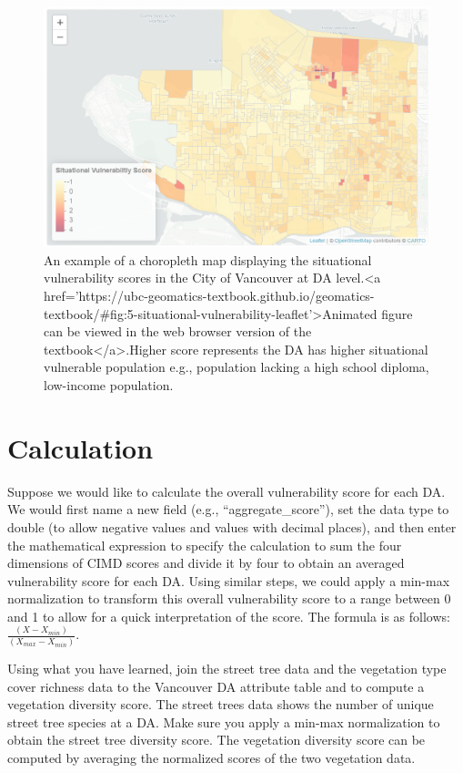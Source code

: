\documentclass[
]{book}
\begin{document}
\begin{figure}
\includegraphics[width=1\linewidth]{images/05-situational-vulnerability-leaflet} \caption{An example of a choropleth map displaying the situational vulnerability scores in the City of Vancouver at DA level.<a href='https://ubc-geomatics-textbook.github.io/geomatics-textbook/#fig:5-situational-vulnerability-leaflet'>Animated figure can be viewed in the web browser version of the textbook</a>.Higher score represents the DA has higher situational vulnerable population e.g., population lacking a high school diploma, low-income population.}\label{fig:5-situational-vulnerability-leaflet}
\end{figure}

\section{Calculation}\label{calculation}

Suppose we would like to calculate the overall vulnerability score for each DA. We would first name a new field (e.g., ``aggregate\_score''), set the data type to double (to allow negative values and values with decimal places), and then enter the mathematical expression to specify the calculation to sum the four dimensions of CIMD scores and divide it by four to obtain an averaged vulnerability score for each DA. Using similar steps, we could apply a min-max normalization to transform this overall vulnerability score to a range between 0 and 1 to allow for a quick interpretation of the score. The formula is as follows: \(\frac{(X - X_{min})}{(X_{max} - X_{min})}\).

Using what you have learned, join the street tree data and the vegetation type cover richness data to the Vancouver DA attribute table and to compute a vegetation diversity score. The street trees data shows the number of unique street tree species at a DA. Make sure you apply a min-max normalization to obtain the street tree diversity score. The vegetation diversity score can be computed by averaging the normalized scores of the two vegetation data.
\end{document}

